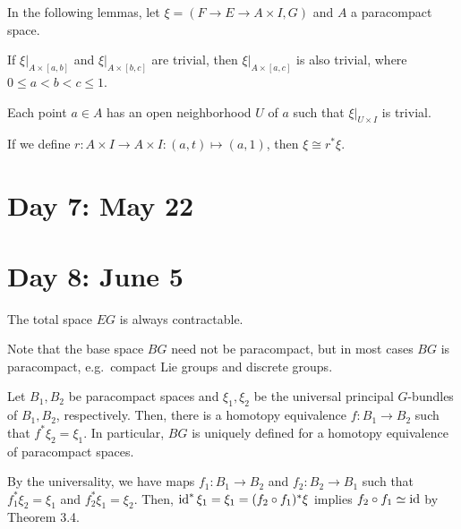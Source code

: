 \documentclass{../../small}
\begin{document}
In the following lemmas, let $\xi=(F\to E\to A\times I,G)$ and $A$ a paracompact space.
\begin{lem*}[Step 1 of 3.2]
If $\xi|_{A\times[a,b]}$ and $\xi|_{A\times[b,c]}$ are trivial, then $\xi|_{A\times[a,c]}$ is also trivial, where $0\le a<b<c\le1$.
\end{lem*}
\begin{pf}
	
\end{pf}

\begin{lem*}[Step 2 of 3.2]
Each point $a\in A$ has an open neighborhood $U$ of $a$ such that $\xi|_{U\times I}$ is trivial.
\end{lem*}
\begin{pf}
	
\end{pf}

\begin{lem*}[Step 3 of 3.2]
If we define $r:A\times I\to A\times I:(a,t)\mapsto(a,1)$, then $\xi\cong r^*\xi$.
\end{lem*}
\begin{pf}
	
\end{pf}


\newpage
\section{Day 7: May 22}

\newpage
\section{Day 8: June 5}
The total space $EG$ is always contractable.

Note that the base space $BG$ need not be paracompact, but in most cases $BG$ is paracompact, e.g.~compact Lie groups and discrete groups.

\begin{prop*}[3.7]
Let $B_1,B_2$ be paracompact spaces and $\xi_1,\xi_2$ be the universal principal $G$-bundles of $B_1,B_2$, respectively.
Then, there is a homotopy equivalence $f:B_1\to B_2$ such that $f^*\xi_2=\xi_1$.
In particular, $BG$ is uniquely defined for a homotopy equivalence of paracompact spaces.
\end{prop*}
\begin{pf}
By the universality, we have maps $f_1:B_1\to B_2$ and $f_2:B_2\to B_1$ such that $f_1^*\xi_2=\xi_1$ and $f_2^*\xi_1=\xi_2$.
Then, $\operatorname{id}^*\xi_1=\xi_1=(f_2\circ f_1)^*\xi$ implies $f_2\circ f_1\simeq\operatorname{id}$ by Theorem 3.4.
\end{pf}
\end{document}
